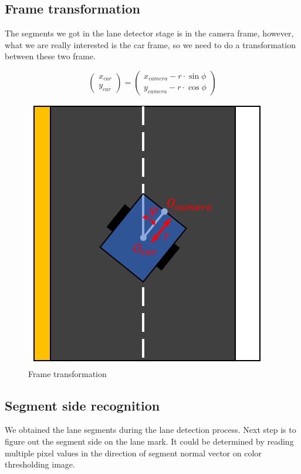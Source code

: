 \documentclass{article}
\begin{document}
\subsection{Frame transformation}

The segments we got in the lane detector stage is in the camera frame, however, what we are really interested is the car frame, so we need to do a transformation between these two frame.

\[
\begin{pmatrix} x_{car} \\ y_{car} \end{pmatrix} = 
\begin{pmatrix} x_{camera} - r \cdot \sin\phi \\ y_{camera} - r \cdot \cos\phi \end{pmatrix}
\]

\begin{figure}[ht]
  \label{fig:frame_transformation}
  \centering
  \includegraphics[scale=0.7]{graphs/frame_transformation.PNG}
  \caption{Frame transformation}
\end{figure}
\FloatBarrier

\subsection{Segment side recognition}
We obtained the lane segments during the lane detection process. Next step is to figure out the segment side on the lane mark. It could be determined by reading multiple pixel values in the direction of segment normal vector on color thresholding image.
\end{document}
